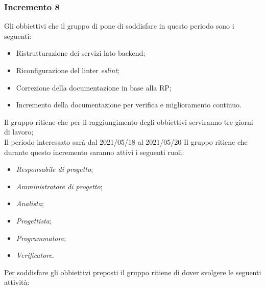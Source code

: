 \subsubsection{Incremento 8}
Gli obbiettivi che il gruppo di pone di soddisfare in questo periodo sono i seguenti:
\begin{itemize}
    \item Ristrutturazione dei servizi lato backend;
    \item Riconfigurazione del linter \textit{eslint};
    \item Correzione della documentazione in base alla RP;
    \item Incremento della documentazione per verifica e miglioramento continuo.
\end{itemize}
Il gruppo ritiene che per il raggiungimento degli obbiettivi serviranno tre giorni di lavoro;\\
Il periodo interessato sarà dal 2021/05/18 al 2021/05/20
Il gruppo ritiene che durante questo incremento saranno attivi i seguenti ruoli:
\begin{itemize}
    \item \textit{Responsabile di progetto};
    \item \textit{Amministratore di progetto};
    \item \textit{Analista};
    \item \textit{Progettista};
    \item \textit{Programmatore};
    \item \textit{Verificatore}.
\end{itemize}
Per soddisfare gli obbiettivi preposti il gruppo ritiene di dover svolgere le seguenti attività:
